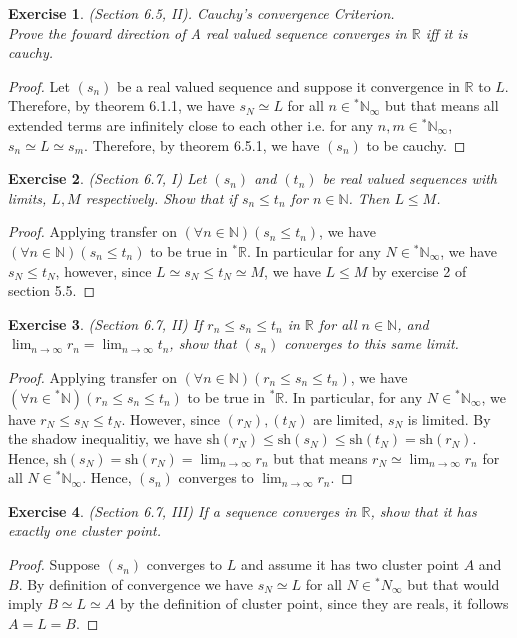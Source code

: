 \documentclass[a4paper, 11pt]{book}
\theoremstyle{plain}
\newtheorem{exercise}{Exercise}[chapter]
\theoremstyle{plain}
\newcommand{\arr}{\rightarrow}
\newcommand{\N}{\mathbb{N}}
\newcommand{\R}{\mathbb{R}}
\newcommand{\hyp}{{}^*}
\newcommand{\sh}{\text{sh}}
\begin{document}
  \begin{exercise}
    (Section 6.5, II). Cauchy's convergence Criterion. \\
    Prove the foward direction of \textit{A real valued sequence converges in $\R$ iff it is cauchy}.
  \end{exercise}
  \begin{proof}
    Let $(s_n)$ be a real valued sequence and suppose it convergence in $\R$ to $L$. Therefore, by theorem 6.1.1, we have $s_N \simeq L$ for all $n \in \hyp \N_\infty$ but that means all extended terms are infinitely close to each other i.e. for any $n,m \in \hyp \N_\infty$, $s_n \simeq L \simeq s_m$. Therefore, by theorem 6.5.1, we have $(s_n)$ to be cauchy.
  \end{proof}

  \begin{exercise}
    (Section 6.7, I)
    Let $(s_n)$ and $(t_n)$ be real valued sequences with limits, $L, M$ respectively. Show that if $s_n \leq t_n$ for $n \in \N$. Then $L \leq M$.
  \end{exercise}
  \begin{proof}
    Applying transfer on $(\forall n \in \N)(s_n \leq t_n)$, we have $(\forall n \in \N)(s_n \leq t_n)$ to be true in $\hyp \R$. In particular for any $N \in \hyp \N_\infty$, we have $s_N \leq t_N$, however, since $L \simeq s_N \leq t_N \simeq M$, we have $L \leq M$ by exercise 2 of section 5.5.
  \end{proof}
  
  \begin{exercise}
    (Section 6.7, II)
    If $r_n \leq s_n \leq t_n$ in $\R$ for all $n \in \N$, and $\lim_{n \arr \infty} r_n=\lim_{n \arr \infty} t_n$, show that $(s_n)$ converges to this same limit.
  \end{exercise}
  \begin{proof}
    Applying transfer on $(\forall n \in \N)(r_n \leq s_n \leq t_n)$, we have $(\forall n \in \hyp \N)(r_n \leq s_n \leq t_n)$ to be true in $\hyp \R$. In particular, for any $N \in \hyp \N_\infty$, we have $r_N \leq s_N \leq t_N$. However, since $(r_N), (t_N)$ are limited, $s_N$ is limited. By the shadow inequalitiy, we have $\sh(r_N) \leq \sh(s_N) \leq \sh(t_N)=\sh(r_N)$. Hence, $\sh(s_N)=\sh(r_N)=\lim_{n \arr \infty} r_n$ but that means $r_N \simeq \lim_{n \arr \infty} r_n$ for all $N \in \hyp \N_\infty$. Hence, $(s_n)$ converges to $\lim_{n \arr \infty} r_n$.
  \end{proof}

  \begin{exercise}
    (Section 6.7, III)
    If a sequence converges in $\R$, show that it has exactly one cluster point.
  \end{exercise}
  \begin{proof}
    Suppose $(s_n)$ converges to $L$ and assume it has two cluster point $A$ and $B$. By definition of convergence we have $s_N \simeq L$ for all $N \in \hyp N_\infty$ but that would imply $B \simeq L \simeq A$ by the definition of cluster point, since they are reals, it follows $A=L=B$. 
  \end{proof}
\end{document}

